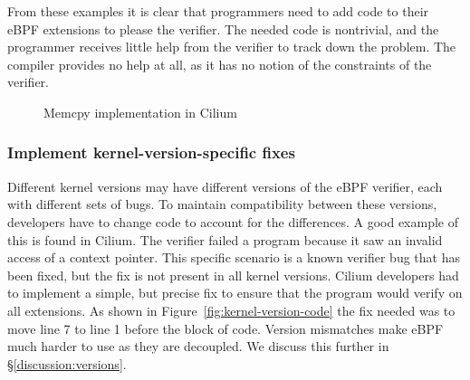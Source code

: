 From these examples it is clear that programmers need to add code to their
    eBPF extensions to please the verifier.
The needed code is nontrivial, and the programmer receives little help from the verifier to track down
    the problem.
The compiler provides no help at all, as it has no notion of the constraints of the verifier.

\begin{figure}
    
    \vspace{-10pt}
    \caption{Memcpy implementation in Cilium}
    \vspace{-10pt}
    \label{fig:cilium-memcpy}
\end{figure}

\subsubsection{Implement kernel-version-specific fixes}
\label{motivation:kernel-version}
Different kernel versions may have different versions of the eBPF verifier, each with different sets of bugs.
To maintain compatibility between these versions, developers have to change code to account for the differences.
A good example of this is found in Cilium.
The verifier failed a program because it saw an invalid access of a context pointer.
This specific scenario is a known verifier bug that has been fixed, but the fix is not present in all kernel versions.
Cilium developers had to implement a simple, but precise fix to ensure that the program would verify on all extensions.
As shown in Figure~\ref{fig:kernel-version-code} the fix needed was to move line 7 to line 1 before the block of code.
Version mismatches make eBPF much harder to use as they are decoupled.
We discuss this further in \S\ref{discussion:versions}.


